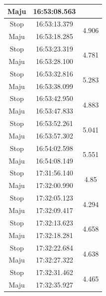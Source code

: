 \begin{longtable}{|c|c|c|}
  Maju           & 16:53:08.563        &                         \\ \hline
  Stop           & 16:53:13.379        & \multirow{2}{*}{4.906}  \\ \cline{1-2}
  Maju           & 16:53:18.285        &                         \\ \hline
  Stop           & 16:53:23.319        & \multirow{2}{*}{4.781}  \\ \cline{1-2}
  Maju           & 16:53:28.100        &                         \\ \hline
  Stop           & 16:53:32.816        & \multirow{2}{*}{5.283}  \\ \cline{1-2}
  Maju           & 16:53:38.099        &                         \\ \hline
  Stop           & 16:53:42.950        & \multirow{2}{*}{4.883}  \\ \cline{1-2}
  Maju           & 16:53:47.833        &                         \\ \hline
  Stop           & 16:53:52.261        & \multirow{2}{*}{5.041}  \\ \cline{1-2}
  Maju           & 16:53:57.302        &                         \\ \hline
  Stop           & 16:54:02.598        & \multirow{2}{*}{5.551}  \\ \cline{1-2}
  Maju           & 16:54:08.149        &                         \\ \hline
  Stop           & 17:31:56.140        & \multirow{2}{*}{4.85}   \\ \cline{1-2}
  Maju           & 17:32:00.990        &                         \\ \hline
  Stop           & 17:32:05.123        & \multirow{2}{*}{4.294}  \\ \cline{1-2}
  Maju           & 17:32:09.417        &                         \\ \hline
  Stop           & 17:32:13.623        & \multirow{2}{*}{4.658}  \\ \cline{1-2}
  Maju           & 17:32:18.281        &                         \\ \hline
  Stop           & 17:32:22.684        & \multirow{2}{*}{4.638}  \\ \cline{1-2}
  Maju           & 17:32:27.322        &                         \\ \hline
  Stop           & 17:32:31.462        & \multirow{2}{*}{4.465}  \\ \cline{1-2}
  Maju           & 17:32:35.927        &                         \\ \hline

\end{longtable}
